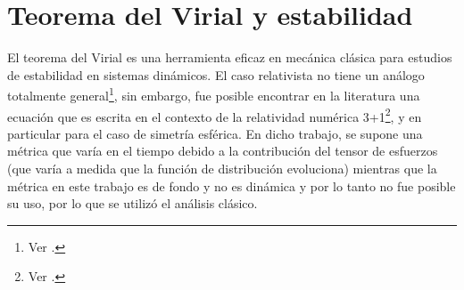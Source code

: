 \documentclass[11pt,twoside,openright,spanish]{report}
\numberwithin{equation}{chapter}
\numberwithin{figure}{chapter}
\numberwithin{table}{chapter}
\begin{document}
\section{Teorema del Virial y estabilidad}\label{sec:: Teo virial}
\noindent
El teorema del Virial es una herramienta eficaz en mecánica clásica para estudios de estabilidad en sistemas dinámicos. El caso relativista no tiene un análogo totalmente general\footnote{Ver \citet{vilainvtigrcfsoss}.}, sin embargo, fue posible encontrar en la literatura una ecuación que es escrita en el contexto de la relatividad numérica 3+1\footnote{Ver \citet{Gourgoulhon1994}.}, y en particular para el caso de simetría esférica. En dicho trabajo, se supone una métrica que varía en el tiempo debido a la contribución del tensor de esfuerzos (que varía a medida que la función de distribución evoluciona) mientras que la métrica en este trabajo es de fondo y no es dinámica y por lo tanto no fue posible su uso, por lo que se utilizó el análisis clásico. 
\end{document}
